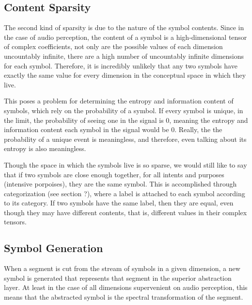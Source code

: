 \subsection{Content Sparsity}
The second kind of sparsity is due to the nature of the symbol contents.  Since in the case of audio perception, the content of a symbol is a high-dimensional tensor of complex coefficients, not only are the possible values of each dimension uncountably infinite, there are a high number of uncountably infinite dimensions for each symbol.  Therefore, it is incredibly unlikely that any two symbols have exactly the same value for every dimension in the conceptual space in which they live.  

This poses a problem for determining the entropy and information content of symbols, which rely on the probability of a symbol.  If every symbol is unique, in the limit, the probability of seeing one in the signal is 0, meaning the entropy and information content each symbol in the signal would be 0. Really, the the probability of a unique event is meaningless, and therefore, even talking about its entropy is also meaningless.  

Though the space in which the symbols live is so sparse, we would still like to say that if two symbols are close enough together, for all intents and purposes (intensive porpoises), they are the same symbol.  This is accomplished through categorization (see section ?), where a label is attached to each symbol according to its category.  If two symbols have the same label, then they are equal, even though they may have different contents, that is, different values in their complex tensors.

\subsection{Symbol Generation}
When a segment is cut from the stream of symbols in a given dimension, a new symbol is generated that represents that segment in the superior abstraction layer.  At least in the case of all dimensions supervenient on audio perception, this means that the abstracted symbol is the spectral transformation of the segment.
